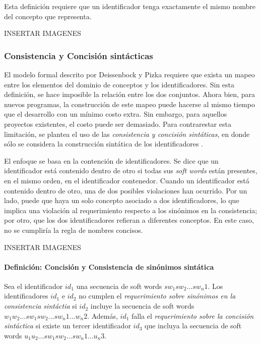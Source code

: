 Esta definición requiere que un identificador tenga exactamente el mismo nombre del concepto que representa.

INSERTAR IMAGENES

\subsubsection{Consistencia y Concisión sintácticas}
El modelo formal descrito por Deissenbock y Pizka requiere que exista un mapeo entre los elementos del dominio de conceptos y los identificadores.
Sin esta definición, se hace imposible la relación entre los dos conjuntos.
Ahora bien, para nuevos programas, la construcción de este mapeo puede hacerse al mismo tiempo que el desarrollo con un mínimo costo extra.
Sin embargo, para aquellos proyectos existentes, el costo puede ser demasiado.
Para contrarestar esta limitación, se plantea el uso de las \textit{consistencia y concisión sintáticas}, en donde sólo se considera la construcción sintática de los identificadores \cite{LawrieFeildBinkley06}.

El enfoque se basa en la contención de identificadores.
Se dice que un identificador está contenido dentro de otro si todas sus \textit{soft words} están presentes, en el mismo orden, en el identificador contenedor.
Cuando un identificador está contenido dentro de otro, una de dos posibles violaciones han ocurrido.
Por un lado, puede que haya un solo concepto asociado a dos identificadores, lo que implica una violación al requerimiento respecto a los sinónimos en la consistencia; por otro, que los dos identificadores refieran a diferentes conceptos.
En este caso, no se cumpliría la regla de nombres concisos.

INSERTAR IMAGENES

\paragraph{Definición: Concisión y Consistencia de sinónimos sintática}
Sea el identificador $id_1$ una secuencia de soft words $sw_1 sw_2 ... sw_n1$. 
Los identificadores $id_1$ e $id_2$ no cumplen el \textit{requerimiento sobre sinónimos en la consistencia sintáctia} si $id_2$ incluye la secuencia de soft words $w_1 w_2 ... sw_1 sw_2 ... sw_n1 ... w_n2$. 
Además, $id_1$ falla el \textit{requerimiento sobre la concisión sintáctica} si existe un tercer identificador $id_3$ que incluya la secuencia de soft words $u_1 u_2 ... sw_1 sw_2 ... sw_n1 ... u_n3$.
